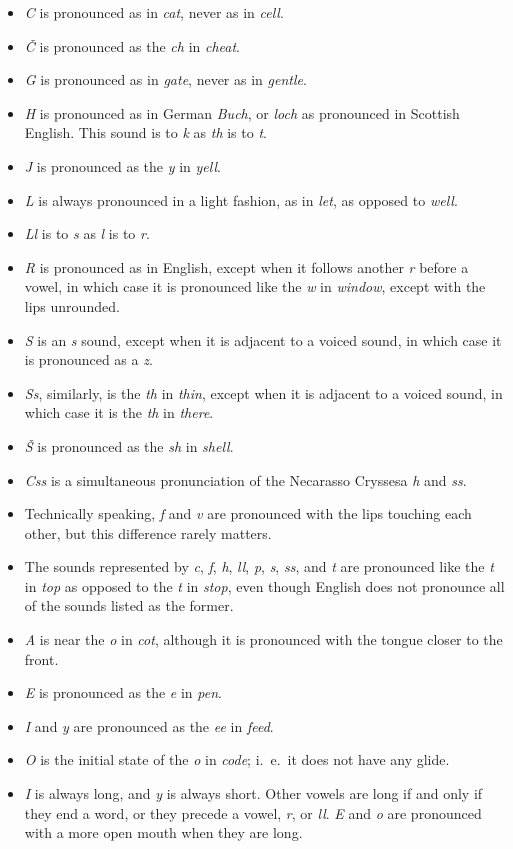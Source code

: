 \begin{itemize}
	\item \emph{C} is pronounced as in \emph{cat}, never as in \emph{cell}.
	\item \emph{\v{C}} is pronounced as the \emph{ch} in \emph{cheat}.
	\item \emph{G} is pronounced as in \emph{gate}, never as in \emph{gentle}.
	\item \emph{H} is pronounced as in German \emph{Buch}, or \emph{loch} as pronounced in Scottish English. This sound is to \emph{k} as \emph{th} is to \emph{t}.
	\item \emph{J} is pronounced as the \emph{y} in \emph{yell}.
	\item \emph{L} is always pronounced in a light fashion, as in \emph{let}, as opposed to \emph{well}.
	\item \emph{Ll} is to \emph{s} as \emph{l} is to \emph{r}.
	\item \emph{R} is pronounced as in English, except when it follows another \emph{r} before a vowel, in which case it is pronounced like the \emph{w} in \emph{window}, except with the lips unrounded.
	\item \emph{S} is an \emph{s} sound, except when it is adjacent to a voiced sound, in which case it is pronounced as a \emph{z}.
	\item \emph{Ss}, similarly, is the \emph{th} in \emph{thin}, except when it is adjacent to a voiced sound, in which case it is the \emph{th} in \emph{there}.
	\item \emph{\v{S}} is pronounced as the \emph{sh} in \emph{shell}.
	\item \emph{Css} is a simultaneous pronunciation of the Necarasso Cryssesa \emph{h} and \emph{ss}.
	\item Technically speaking, \emph{f} and \emph{v} are pronounced with the lips touching each other, but this difference rarely matters.
	\item The sounds represented by \emph{c}, \emph{f}, \emph{h}, \emph{ll}, \emph{p}, \emph{s}, \emph{ss}, and \emph{t} are pronounced like the \emph{t} in \emph{top} as opposed to the \emph{t} in \emph{stop}, even though English does not pronounce all of the sounds listed as the former.
	\item \emph{A} is near the \emph{o} in \emph{cot}, although it is pronounced with the tongue closer to the front.
	\item \emph{E} is pronounced as the \emph{e} in \emph{pen}.
	\item \emph{I} and \emph{y} are pronounced as the \emph{ee} in \emph{feed}.
	\item \emph{O} is the initial state of the \emph{o} in \emph{code}; i.~e.~it does not have any glide.
	\item \emph{I} is always long, and \emph{y} is always short. Other vowels are long if and only if they end a word, or they precede a vowel, \emph{r}, or \emph{ll}. \emph{E} and \emph{o} are pronounced with a more open mouth when they are long.
\end{itemize}